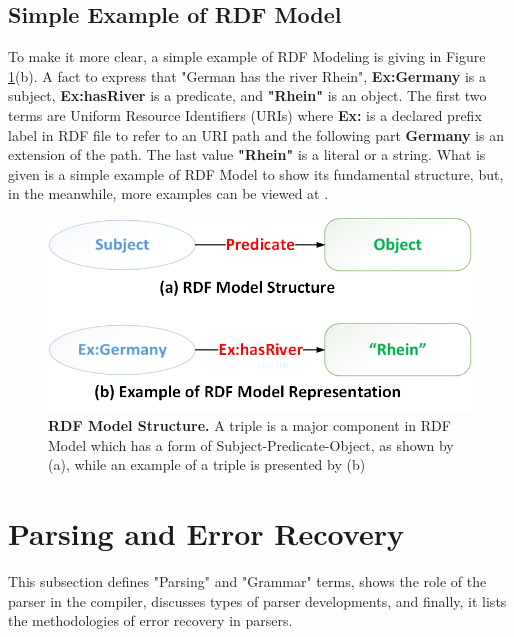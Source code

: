 \subsection{Simple Example of RDF Model}

To make it more clear, a simple example of RDF Modeling is giving in Figure \ref{Fig:rdfModel}(b). A fact to express that "German has the river Rhein", \textbf{Ex:Germany} is a subject, \textbf{Ex:hasRiver} is a predicate, and \textbf{"Rhein"} is an object. The first two terms are Uniform Resource Identifiers (URIs) where \textbf{Ex:} is a declared prefix label in RDF file to refer to an URI path and the following part \textbf{Germany} is an extension of the path. The last value \textbf{"Rhein"} is a literal or a string. What is given is a simple example of RDF Model to show its fundamental structure, but, in the meanwhile, more examples can be viewed at \cite{W3C:RDF-Primer:Online}.

\begin{figure}[ht]
	\begin{center}
		\includegraphics[scale=0.4,angle=0]{images/RDF-Model}
		\caption{\textbf{ RDF Model Structure.} A triple is a major component in RDF Model which has a form of Subject-Predicate-Object, as shown by (a), while an example of a triple is presented by (b) }
		\label{Fig:rdfModel}
	\end{center}
\end{figure}

\section{Parsing and Error Recovery}
\label{sec:bck_parser}
This subsection defines "Parsing" and "Grammar" terms, shows the role of the parser in the compiler, discusses types of parser developments, and finally, it lists the methodologies of error recovery in parsers. 
